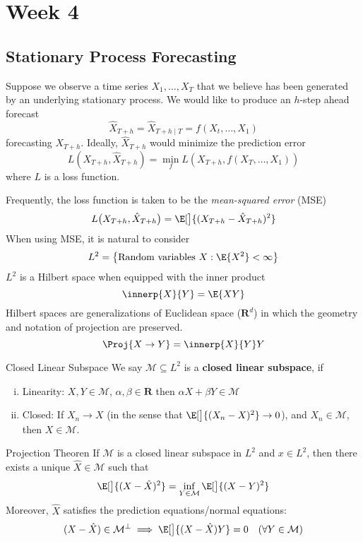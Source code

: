 \chapter{Week 4}
\section{Stationary Process Forecasting}
Suppose we observe a time series
$ X_1,\ldots,X_T $
that we believe has been generated by an underlying
stationary process. We would like to
produce an $ h $-step ahead
forecast
\[ \hat{X}_{T+h}=\hat{X}_{T+h\mid T}=f(X_t,\ldots,X_1) \]
forecasting $ X_{T+h} $. Ideally, $ \hat{X}_{T+h} $
would minimize the prediction error
\[ L(X_{T+h},\hat{X}_{T+h})=\min_f
    L(X_{T+h},f(X_{T},\ldots,X_1)) \]
where $ L $ is a loss function.

Frequently, the loss function is taken
to be the \emph{mean-squared error} (MSE)
\[ L\bigl(X_{T+h},\hat{X}_{T+h}\bigr)=
    \E[\big]{(X_{T+h}-\hat{X}_{T+h})^2} \]
When using MSE, it is natural to consider
\[ L^2=\set[\big]{\text{Random variables } X: \E{X^2}<\infty} \]
$ L^2 $ is a Hilbert space when equipped
with the inner product
\[ \innerp{X}{Y}=\E{XY} \]
Hilbert spaces are generalizations of Euclidean space ($ \mathbf{R}^d $)
in which the geometry and notation of projection
are preserved.
\[ \Proj{X\to Y}=\innerp{X}{Y}Y \]
\begin{Definition}{Closed Linear Subspace}{}
    We say $ \mathcal{M}\subseteq L^2 $
    is a \textbf{closed linear subspace}, if
    \begin{enumerate}[(i)]
        \item Linearity: $ X,Y\in \mathcal{\mathcal{M}} $, $ \alpha,\beta\in\mathbf{R} $
              then $ \alpha X+\beta Y\in \mathcal{M} $
        \item Closed: If $ X_n\to X $ (in the sense that $ \E[\big]{(X_n-X)^2} \to 0 $),
              and $ X_n\in \mathcal{M} $, then $ X\in \mathcal{M} $.
    \end{enumerate}
\end{Definition}
\begin{Theorem}{Projection Theoren}{}
    If $ \mathcal{M} $ is a closed linear subspace in $ L^2 $
    and $ x\in L^2 $, then there exists a
    unique $ \hat{X}\in \mathcal{M} $ such that
    \[ \E[\big]{(X-\hat{X})^2}=\inf_{Y\in \mathcal{M}}\E[\big]{(X-Y)^2} \]
    Moreover, $ \hat{X} $ satisfies the prediction equations/normal
    equations:
    \[ (X-\hat{X})\in \mathcal{M}^\perp \implies \E[\big]{(X-\hat{X})Y}=0\quad (\forall Y\in \mathcal{M}) \]
\end{Theorem}
